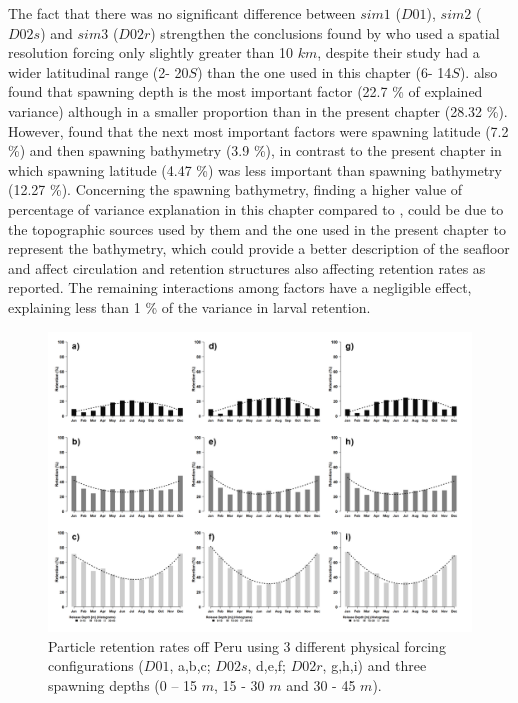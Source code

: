 The fact that there was no significant difference between $sim 1$ ($D01$), $sim 2$ ($D02s$) and $sim 3$ ($D02r$) strengthen the conclusions found by \citep{BrocLett2008} who used a spatial resolution forcing only slightly greater than 10 $km$, despite their study had a wider latitudinal range (2\textdegree - 20\textdegree $S$) than the one used in this chapter (6\textdegree - 14\textdegree $S$). \cite{BrocLett2008} also found that spawning depth is the most important factor (22.7 \% of explained variance) although in a smaller proportion than in the present chapter (28.32 \%). However, \cite{BrocLett2008} found that the next most important factors were spawning latitude (7.2 \%) and then spawning bathymetry (3.9 \%), in contrast to the present chapter in which spawning latitude (4.47 \%) was less important than spawning bathymetry (12.27 \%). Concerning the spawning bathymetry, finding a higher value of percentage of variance explanation in this chapter compared to \cite{BrocLett2008}, could be due to the topographic sources \citep{SmitSand1997} used by them and the one used in the present chapter \citep{BeckSand2009} to represent the bathymetry, which could provide a better description of the seafloor and affect circulation and retention structures also affecting retention rates as \cite{RojaLand2014} reported. The remaining interactions among factors have a negligible effect, explaining less than 1 \% of the variance in larval retention.\\

\begin{center}
\begin{figure}[H]
	\includegraphics[width=1.0\textwidth]{figures/Chap2Recruitment3sim3depth.png}
	\centering
	\caption{Particle retention rates off Peru using 3 different physical forcing configurations ($D01$, a,b,c; $D02s$, d,e,f; $D02r$, g,h,i) and three spawning depths (0 – 15 $m$, 15 - 30 $m$ and 30 - 45 $m$).}
	\label{Chap2Recruitment3sim3depth}
\end{figure}
\end{center}

